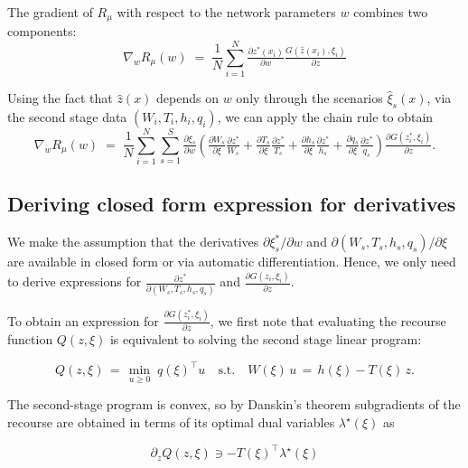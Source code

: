 \documentclass{article}
\begin{document}
The gradient of $R_\mu$ with respect to the network parameters $w$ combines two components:
\begin{equation}
\nabla_w R_\mu(w) \;=\; \frac{1}{N}\sum_{i=1}^N
\tfrac{\partial z^*(x_i)}{\partial w} \tfrac{G(\hat z(x_i), \xi_i)}{\partial z}
\end{equation}

Using the fact that $\hat z(x)$ depends on $w$ only through the scenarios $\hat \xi_s(x)$, via the second stage data $(W_i, T_i, h_i, q_i)$, we can apply the chain rule to obtain
\begin{equation}
\nabla_w R_\mu(w) \;=\; \frac{1}{N}\sum_{i=1}^N \sum_{s=1}^S \tfrac{\partial \xi_s}{\partial w} \left(
\tfrac{\partial W_s}{\partial \xi} \tfrac{\partial z^*}{W_s} + 
\tfrac{\partial T_s}{\partial \xi} \tfrac{\partial z^*}{T_s} +
\tfrac{\partial h_s}{\partial \xi} \tfrac{\partial z^*}{h_s} +
\tfrac{\partial q_s}{\partial \xi} \tfrac{\partial z^*}{q_s} \right)
\tfrac{\partial G(z^*_i, \xi_i)}{\partial z}.
\end{equation}

\subsection{Deriving closed form expression for derivatives}

We make the assumption that the derivatives $\partial \xi^*_s/\partial w$ and $\partial (W_s,T_s,h_s,q_s)/\partial \xi$ are available in closed form or via automatic differentiation.
Hence, we only need to derive expressions for $\tfrac{\partial z^*}{\partial (W_s,T_s,h_s,q_s)}$ and $\tfrac{\partial G(z_i, \xi_i)}{\partial z}$.


To obtain an expression for $\tfrac{\partial G(z^*_i, \xi_i)}{\partial z}$, we first note that 
evaluating the recourse function $Q(z, \xi)$ is equivalent to solving the second stage linear program:



\begin{equation}
Q(z,\xi) \,=\, \min_{u \ge 0} \; q(\xi)^\top u \quad \text{s.t.}\quad W(\xi)\,u \,=\, h(\xi) - T(\xi)\,z.
\end{equation}

The second-stage program is convex, so by Danskin’s theorem subgradients of the recourse are obtained in terms of its optimal dual variables $\lambda^\star(\xi)$ as

\begin{equation}
\partial_z Q(z,\xi) \ni -T(\xi)^\top \lambda^\star(\xi)
\end{equation}
\end{document}
